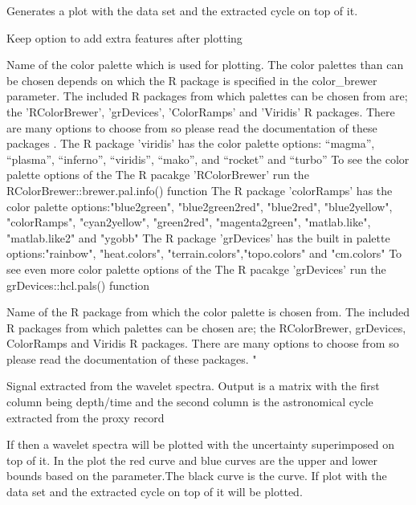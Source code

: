 \documentclass[a4paper]{book}
\begin{document}
\begin{Arguments}
\begin{ldescription}
\item[\code{genplot\_extracted}] Generates a plot with the data set and
the extracted cycle on top  of it.

\item[\code{keep\_editable}] Keep option to add extra features after plotting  

\item[\code{palette\_name}] Name of the color palette which is used for plotting.
The color palettes than can be chosen depends on which the R package is specified in
the color\_brewer parameter. The included R packages from which palettes can be chosen
from are; the 'RColorBrewer', 'grDevices', 'ColorRamps' and 'Viridis' R packages.
There are many options to choose from so please
read the documentation of these packages .
The R package 'viridis' has the color palette options: “magma”, “plasma”,
“inferno”, “viridis”, “mako”, and “rocket”  and “turbo”
To see the color palette options of the The R pacakge 'RColorBrewer' run
the RColorBrewer::brewer.pal.info() function
The R package 'colorRamps' has the color palette options:"blue2green",
"blue2green2red", "blue2red",    "blue2yellow", "colorRamps",    "cyan2yellow",
"green2red", "magenta2green", "matlab.like", "matlab.like2" and    "ygobb"
The R package 'grDevices' has the built in  palette options:"rainbow",
"heat.colors", "terrain.colors","topo.colors" and "cm.colors"
To see even more color palette options of the The R pacakge 'grDevices' run
the grDevices::hcl.pals() function

\item[\code{color\_brewer}] Name of the R package from which the color palette is chosen from.
The included R packages from which palettes can be chosen
are; the RColorBrewer, grDevices, ColorRamps and Viridis R packages.
There are many options to choose from so please
read the documentation of these packages. "
\end{ldescription}
\end{Arguments}
%
\begin{Value}
Signal extracted from the wavelet spectra.
Output is a matrix with the first column being depth/time
and the second column is the astronomical cycle extracted from the proxy record

If  then a wavelet spectra will be plotted
with the uncertainty superimposed on top of it. In the plot the red curve and
blue curves are the upper and lower bounds
based on the  parameter.The black curve is the  curve.
If  plot with the data set and
the extracted cycle on top of it will be plotted.
\end{Value}
\end{document}

